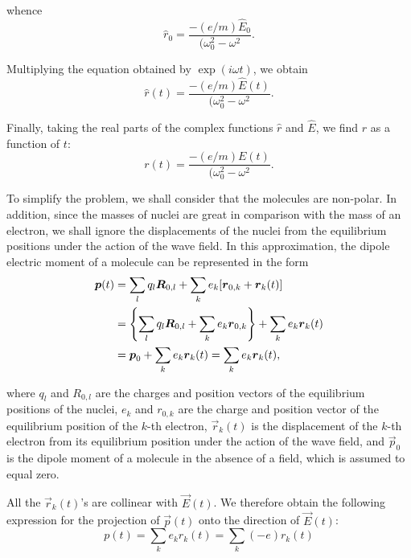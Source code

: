 \noindent
whence
\begin{equation*}
	\hat{r}_0 = \frac{-(e/m) \hat{E}_0}{(\omega_0^2-\omega^2}.
\end{equation*}

\noindent
Multiplying the equation obtained by $\exp(i\omega t)$, we obtain
\begin{equation*}
	\hat{r}(t) = \frac{-(e/m) \hat{E}(t)}{(\omega_0^2-\omega^2}.
\end{equation*}

\noindent
Finally, taking the real parts of the complex functions $\hat{r}$ and $\hat{E}$, we find $r$ as a function of $t$:
\begin{equation}\label{eq:20_20}
	r(t) =\frac{-(e/m) E(t)}{(\omega_0^2-\omega^2}.
\end{equation}

To simplify the problem, we shall consider that the molecules are non-polar.
In addition, since the masses of nuclei are great in comparison with the mass of an electron, we shall ignore the displacements of the nuclei from the equilibrium positions under the action of the wave field.
In this approximation, the dipole electric moment of a molecule can be represented in the form
\begin{align*}
	\boldsymbol{p}(t) &= \sum_l q_l \boldsymbol{R}_{0,l} + \sum_k e_k [\boldsymbol{r}_{0,k} + \boldsymbol{r}_k(t)]\\
	&= \left\{ \sum_l q_l \boldsymbol{R}_{0,l} + \sum_k e_k \boldsymbol{r}_{0,k} \right\} + \sum_k e_k \boldsymbol{r}_k(t)\\
	&= \boldsymbol{p}_0 + \sum_k e_k \boldsymbol{r}_k(t) = \sum_k e_k \boldsymbol{r}_k(t),
\end{align*}

\noindent
where $q_l$ and $R_{0,l}$ are the charges and position vectors of the equilibrium positions of the nuclei, $e_k$ and $r_{0,k}$ are the charge and position vector of the equilibrium position of the $k$-th electron, $\vec{r}_k(t)$ is the displacement of the $k$-th electron from its equilibrium position under the action of the wave
field, and $\vec{p}_0$ is the dipole moment of a molecule in the absence of a field, which is assumed to equal zero.

All the $\vec{r}_k(t)$'s are collinear with $\vec{E}(t)$.
We therefore obtain the following expression for the projection of $\vec{p}(t)$ onto the direction
of $\vec{E}(t)$:
\begin{equation*}
	p(t) = \sum_k e_k r_k(t) = \sum_k (-e) r_k(t)
\end{equation*}

